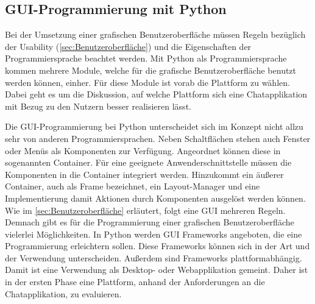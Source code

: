 \documentclass[a4paper,titlepage,halfparskip,12pt]{scrreprt}
\begin{document}
\begin{onehalfspacing}
\subsection{GUI-Programmierung mit Python}
\label{subsec:GuiPython}
Bei der Umsetzung einer grafischen Benutzeroberfläche müssen Regeln bezüglich der Usability (\autoref{sec:Benutzeroberfläche}) und die Eigenschaften der Programmiersprache beachtet werden. Mit Python als Programmiersprache kommen mehrere Module, welche für die grafische Benutzeroberfläche benutzt werden können, einher. Für diese Module ist vorab die Plattform zu wählen. Dabei geht es um die Diskussion, auf welche Plattform sich eine Chatapplikation mit Bezug zu den Nutzern besser realisieren lässt.

Die \ac{GUI}-Programmierung bei Python unterscheidet sich im Konzept nicht allzu sehr von anderen Programmiersprachen. Neben Schaltflächen stehen auch Fenster oder Menüs als Komponenten zur Verfügung. Angeordnet können diese in sogenannten Container. Für eine geeignete Anwenderschnittstelle müssen die Komponenten in die Container integriert werden. Hinzukommt ein äußerer Container, auch als Frame bezeichnet, ein Layout-Manager und eine Implementierung damit Aktionen durch Komponenten ausgelöst werden können. Wie im \autoref{sec:Benutzeroberfläche} erläutert, folgt eine \ac{GUI} mehreren Regeln. Demnach gibt es für die Programmierung einer grafischen Benutzeroberfläche vielerlei Möglichkeiten. In Python werden \ac{GUI} Frameworks angeboten, die eine Programmierung erleichtern sollen. Diese Frameworks können sich in der Art und der Verwendung unterscheiden. Außerdem sind Frameworks plattformabhängig. Damit ist eine Verwendung als Desktop- oder Webapplikation gemeint. Daher ist in der ersten Phase eine Plattform, anhand der Anforderungen an die Chatapplikation, zu evaluieren.\cite{Steyer2018} \\

\end{onehalfspacing}
\end{document}

